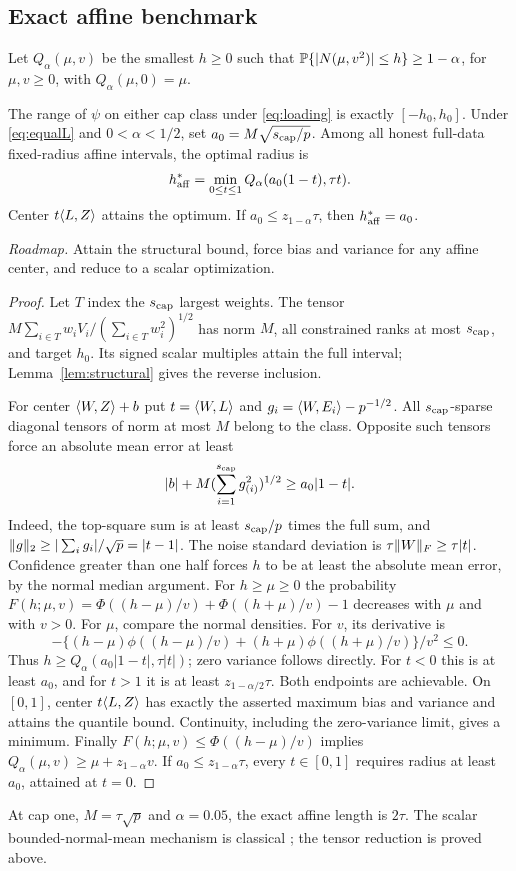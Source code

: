 \subsection{Exact affine benchmark}
Let $Q_\alpha(\mu,v)$ be the smallest $h\ge0$ such that
$\mathbb P\{|N(\mu,v^2)|\le h\}\ge1-\alpha$, for $\mu,v\ge0$, with
$Q_\alpha(\mu,0)=\mu$.

\begin{proposition}\label{prop:affine_exact}
The range of $\psi$ on either cap class under \eqref{eq:loading} is exactly $[-h_0,h_0]$. Under \eqref{eq:equalL} and $0<\alpha<1/2$, set
$a_0=M\sqrt{s_{\rm cap}/p}$. Among all honest full-data fixed-radius affine intervals, the optimal radius is
\[
 h_{\rm aff}^*=\min_{0\le t\le1}Q_\alpha(a_0(1-t),\tau t).
\]
Center $t\langle L,Z\rangle$ attains the optimum. If $a_0\le z_{1-\alpha}\tau$, then $h_{\rm aff}^*=a_0$.
\end{proposition}
\noindent\emph{Roadmap.} Attain the structural bound, force bias and variance for any affine center, and reduce to a scalar optimization.
\begin{proof}
Let $T$ index the $s_{\rm cap}$ largest weights. The tensor
$M\sum_{i\in T}w_iV_i/(\sum_{i\in T}w_i^2)^{1/2}$ has norm $M$, all constrained ranks at most $s_{\rm cap}$, and target $h_0$. Its signed scalar multiples attain the full interval; Lemma~\ref{lem:structural} gives the reverse inclusion.

For center $\langle W,Z\rangle+b$ put $t=\langle W,L\rangle$ and $g_i=\langle W,E_i\rangle-p^{-1/2}$.
All $s_{\rm cap}$-sparse diagonal tensors of norm at most $M$ belong to the class. Opposite such tensors force an absolute mean error at least
\[
 |b|+M(\sum_{i=1}^{s_{\rm cap}}g_{(i)}^2)^{1/2}\ge a_0|1-t|.
\]
Indeed, the top-square sum is at least $s_{\rm cap}/p$ times the full sum, and
$\lVert g\rVert_2\ge|\sum_i g_i|/\sqrt p=|t-1|$.
The noise standard deviation is $\tau\lVert W\rVert_F\ge\tau|t|$.
Confidence greater than one half forces $h$ to be at least the absolute mean error, by the normal median argument.
For $h\ge\mu\ge0$ the probability
$F(h;\mu,v)=\Phi((h-\mu)/v)+\Phi((h+\mu)/v)-1$
decreases with $\mu$ and with $v>0$. For $\mu$, compare the normal densities. For $v$, its derivative is
\[
 -\{(h-\mu)\phi((h-\mu)/v)+(h+\mu)\phi((h+\mu)/v)\}/v^2\le0.
\]
Thus $h\ge Q_\alpha(a_0|1-t|,\tau|t|)$; zero variance follows directly.
For $t<0$ this is at least $a_0$, and for $t>1$ it is at least
$z_{1-\alpha/2}\tau$. Both endpoints are achievable. On $[0,1]$, center $t\langle L,Z\rangle$ has exactly the asserted maximum bias and variance and attains the quantile bound. Continuity, including the zero-variance limit, gives a minimum.
Finally $F(h;\mu,v)\le\Phi((h-\mu)/v)$ implies
$Q_\alpha(\mu,v)\ge\mu+z_{1-\alpha}v$.
If $a_0\le z_{1-\alpha}\tau$, every $t\in[0,1]$ requires radius at least $a_0$, attained at $t=0$.
\end{proof}
At cap one, $M=\tau\sqrt p$ and $\alpha=0.05$, the exact affine length is $2\tau$.
The scalar bounded-normal-mean mechanism is classical \citep{stark1992}; the tensor reduction is proved above.

